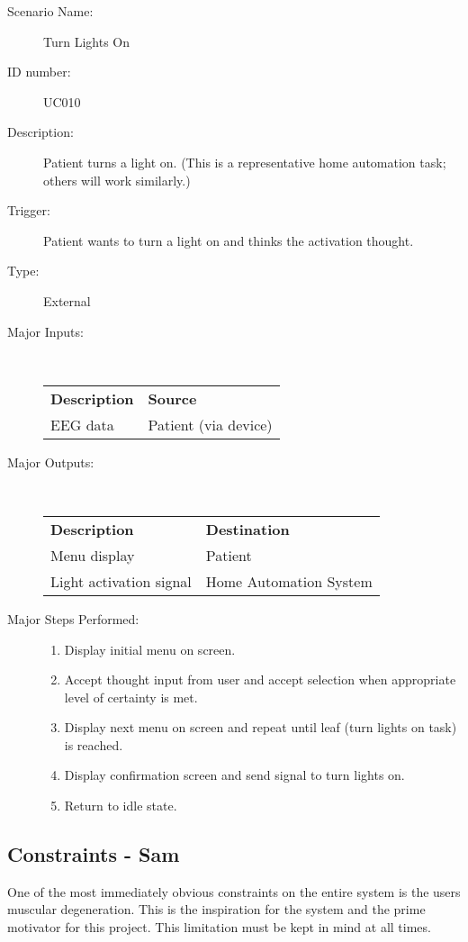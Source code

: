 \documentclass{article}
\begin{document}
\begin{description}
    \item[Scenario Name:] Turn Lights On
    \item[ID number:] UC010
    \item[Description:] Patient turns a light on. (This is a representative
        home automation task; others will work similarly.)
    \item[Trigger:] Patient wants to turn a light on and thinks the activation thought.
    \item[Type:] External
    \item[Major Inputs:] \hfill \\
        \begin{tabular}{l l}
            \textbf{Description} & \textbf{Source} \\
            EEG data & Patient (via device) \\
        \end{tabular}
    \item[Major Outputs:] \hfill \\
        \begin{tabular}{l l}
            \textbf{Description} & \textbf{Destination} \\
            Menu display & Patient \\
            Light activation signal & Home Automation System
        \end{tabular}
    \item[Major Steps Performed:] \hfill
        \begin{enumerate}
            \item Display initial menu on screen.
            \item Accept thought input from user and accept selection when
                appropriate level of certainty is met.
            \item Display next menu on screen and repeat until leaf (turn
                lights on task) is reached.
            \item Display confirmation screen and send signal to turn lights
                on.
            \item Return to idle state.
        \end{enumerate}
\end{description}

\subsection{Constraints - Sam}
One of the most immediately obvious constraints on the entire system is the
users muscular degeneration. This is the inspiration for the system and the
prime motivator for this project. This limitation must be kept in mind at
all times.
\end{document}
